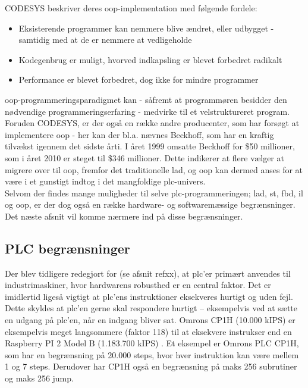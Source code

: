 
\noindent CODESYS beskriver deres \gls{oop}-implementation med følgende fordele\cite{codesys-oop-benefits}:
\begin{itemize}
\item Eksisterende programmer kan nemmere blive ændret, eller udbygget - samtidig med at de er nemmere at vedligeholde
\item Kodegenbrug er muligt, hvorved indkapsling er blevet forbedret radikalt
\item Performance er blevet forbedret, dog ikke for mindre programmer
\end{itemize}

\noindent\gls{oop}-programmeringsparadigmet kan - såfremt at programmøren besidder den nødvendige programmeringserfaring - medvirke til et velstruktureret program. Foruden CODESYS, er der også en række andre producenter, som har forsøgt at implementere \gls{oop} - her kan der bl.a. nævnes Beckhoff, som har en kraftig tilvækst igennem det sidste årti. I året 1999 omsatte Beckhoff for \$50 millioner, som i året 2010 er steget til \$346 millioner. Dette indikerer at flere vælger at migrere over til \gls{oop}, fremfor det traditionelle \gls{lad}, og \gls{oop} kan dermed anses for at være i et gunstigt indtog i det mangfoldige \gls{plc}-univers\cite{beckhoff-sold}. \\

\noindent Selvom der findes mange muligheder til selve \gls{plc}-programmeringen; \gls{lad}, \gls{st}, \gls{fbd}, \gls{il} og \gls{oop}, er der dog også en række hardware- og softwaremæssige begrænsninger. Det næste afsnit vil komme nærmere ind på disse begrænsninger.

\subsection{PLC begrænsninger}\label{sec:plcprob}
Der blev tidligere redegjort for (se afsnit refxx), at \gls{plc}’er primært anvendes til industrimaskiner, hvor hardwarens robusthed er en central faktor. Det er imidlertid ligeså vigtigt at \gls{plc}’ens instruktioner eksekveres hurtigt og uden fejl. Dette skyldes at \gls{plc}’en gerne skal respondere hurtigt – eksempelvis ved at sætte en udgang på \gls{plc}’en, når en indgang bliver sat. Omrons CP1H (10.000 kIPS) er eksempelvis meget langsommere (faktor 118) til at eksekvere instrukser end en Raspberry PI 2 Model B (1.183.700 kIPS) \cite{ (raspberry) }. Et eksempel er Omrons PLC CP1H, som har en begrænsning på 20.000 steps, hvor hver instruktion kan være mellem 1 og 7 steps. Derudover har CP1H også en begrænsning på maks 256 subrutiner og maks 256 jump. \cite{cp1h} \cite{raspBench}

